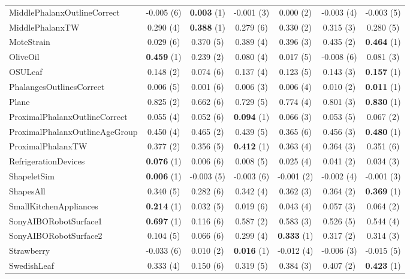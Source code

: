 \begin{table}[ht]
\begin{adjustbox}{width=\textwidth}
\begin{tabular}{lcccccc}
    MiddlePhalanxOutlineCorrect & -0.005 (6) & \textbf{0.003} (1) & -0.001 (3) & 0.000 (2) & -0.003 (4) & -0.003 (5) \\
    MiddlePhalanxTW & 0.290 (4) & \textbf{0.388} (1) & 0.279 (6) & 0.330 (2) & 0.315 (3) & 0.280 (5) \\
    MoteStrain & 0.029 (6) & 0.370 (5) & 0.389 (4) & 0.396 (3) & 0.435 (2) & \textbf{0.464} (1) \\
    OliveOil & \textbf{0.459} (1) & 0.239 (2) & 0.080 (4) & 0.017 (5) & -0.008 (6) & 0.081 (3) \\
    OSULeaf & 0.148 (2) & 0.074 (6) & 0.137 (4) & 0.123 (5) & 0.143 (3) & \textbf{0.157} (1) \\
    PhalangesOutlinesCorrect & 0.006 (5) & 0.001 (6) & 0.006 (3) & 0.006 (4) & 0.010 (2) & \textbf{0.011} (1) \\
    Plane & 0.825 (2) & 0.662 (6) & 0.729 (5) & 0.774 (4) & 0.801 (3) & \textbf{0.830} (1) \\
    ProximalPhalanxOutlineCorrect & 0.055 (4) & 0.052 (6) & \textbf{0.094} (1) & 0.066 (3) & 0.053 (5) & 0.067 (2) \\
    ProximalPhalanxOutlineAgeGroup & 0.450 (4) & 0.465 (2) & 0.439 (5) & 0.365 (6) & 0.456 (3) & \textbf{0.480} (1) \\
    ProximalPhalanxTW & 0.377 (2) & 0.356 (5) & \textbf{0.412} (1) & 0.363 (4) & 0.364 (3) & 0.351 (6) \\
    RefrigerationDevices & \textbf{0.076} (1) & 0.006 (6) & 0.008 (5) & 0.025 (4) & 0.041 (2) & 0.034 (3) \\
    ShapeletSim & \textbf{0.006} (1) & -0.003 (5) & -0.003 (6) & -0.001 (2) & -0.002 (4) & -0.001 (3) \\
    ShapesAll & 0.340 (5) & 0.282 (6) & 0.342 (4) & 0.362 (3) & 0.364 (2) & \textbf{0.369} (1) \\
    SmallKitchenAppliances & \textbf{0.214} (1) & 0.032 (5) & 0.019 (6) & 0.043 (4) & 0.057 (3) & 0.064 (2) \\
    SonyAIBORobotSurface1 & \textbf{0.697} (1) & 0.116 (6) & 0.587 (2) & 0.583 (3) & 0.526 (5) & 0.544 (4) \\
    SonyAIBORobotSurface2 & 0.104 (5) & 0.066 (6) & 0.299 (4) & \textbf{0.333} (1) & 0.317 (2) & 0.314 (3) \\
    Strawberry & -0.033 (6) & 0.010 (2) & \textbf{0.016} (1) & -0.012 (4) & -0.006 (3) & -0.015 (5) \\
    SwedishLeaf & 0.333 (4) & 0.150 (6) & 0.319 (5) & 0.384 (3) & 0.407 (2) & \textbf{0.423} (1) \\

\end{tabular}
\end{adjustbox}
\end{table}
